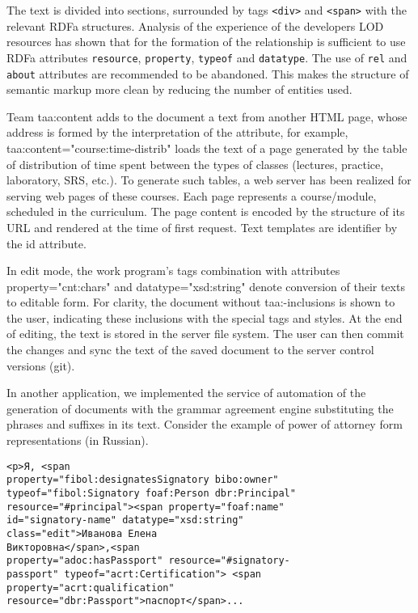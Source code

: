 \documentclass[conference,a4paper]{IEEEtran}
\begin{document}
The text is divided into sections, surrounded by tags \texttt{<div>} and \texttt{<span>} with the relevant RDFa structures.  Analysis of the experience of the developers LOD resources has shown that for the formation of the relationship is sufficient to use RDFa attributes \texttt{resource}, \texttt{property}, \texttt{typeof} and \texttt{datatype}.  The use of \texttt{rel} and \texttt{about} attributes are recommended to be abandoned.  This makes the structure of semantic markup more clean by reducing the number of entities used.

Team taa:content adds to the document a text from another HTML page,
whose address is formed by the interpretation of the attribute, for
example, taa:content="course:time-distrib" loads the text of a page
generated by the table of distribution of time spent between the types
of classes (lectures, practice, laboratory, SRS, etc.). To generate such
tables, a web server has been realized for serving web pages of these
courses. Each page represents a course/module, scheduled in the
curriculum. The page content is encoded by the structure of its URL and
rendered at the time of first request. Text templates are identifier by
the id attribute.

In edit mode, the work program's tags combination with attributes
property="cnt:chars" and datatype="xsd:string" denote conversion of
their texts to editable form. For clarity, the document without
taa:-inclusions is shown to the user, indicating these inclusions with
the special tags and styles. At the end of editing, the text is stored
in the server file system. The user can then commit the changes and sync
the text of the saved document to the server control versions (git).

In another application, we implemented the service of automation of the
generation of documents with the grammar agreement engine substituting
the phrases and suffixes in its text. Consider the example of power of
attorney form representations (in Russian).

\begin{verbatim}
<p>Я, <span
property="fibol:designatesSignatory bibo:owner"
typeof="fibol:Signatory foaf:Person dbr:Principal"
resource="#principal"><span property="foaf:name"
id="signatory-name" datatype="xsd:string"
class="edit">Иванова Елена
Викторовна</span>,<span
property="adoc:hasPassport" resource="#signatory-
passport" typeof="acrt:Certification"> <span
property="acrt:qualification"
resource="dbr:Passport">паспорт</span>...
\end{verbatim}
\end{document}
